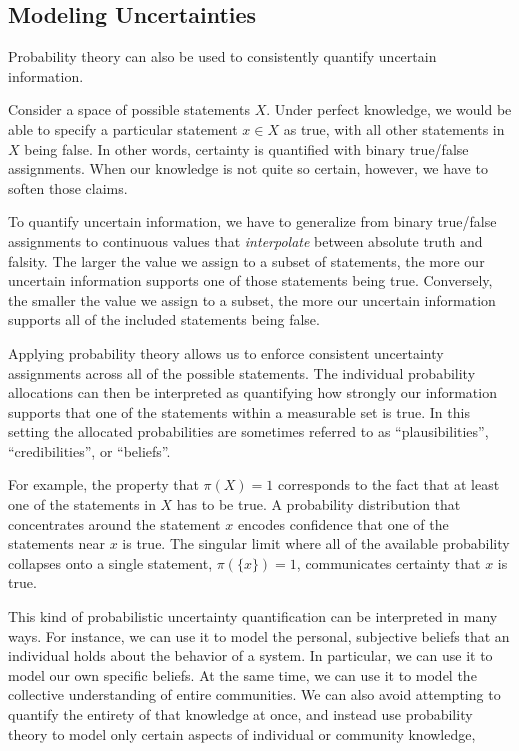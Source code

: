 \documentclass[
  letterpaper,
  DIV=11,
  numbers=noendperiod]{scrartcl}
\begin{document}
\subsection{Modeling Uncertainties}\label{modeling-uncertainties}

Probability theory can also be used to consistently quantify uncertain
information.

Consider a space of possible statements \(X\). Under perfect knowledge,
we would be able to specify a particular statement \(x \in X\) as true,
with all other statements in \(X\) being false. In other words,
certainty is quantified with binary true/false assignments. When our
knowledge is not quite so certain, however, we have to soften those
claims.

To quantify uncertain information, we have to generalize from binary
true/false assignments to continuous values that \emph{interpolate}
between absolute truth and falsity. The larger the value we assign to a
subset of statements, the more our uncertain information supports one of
those statements being true. Conversely, the smaller the value we assign
to a subset, the more our uncertain information supports all of the
included statements being false.

Applying probability theory allows us to enforce consistent uncertainty
assignments across all of the possible statements. The individual
probability allocations can then be interpreted as quantifying how
strongly our information supports that one of the statements within a
measurable set is true. In this setting the allocated probabilities are
sometimes referred to as ``plausibilities'', ``credibilities'', or
``beliefs''.

For example, the property that \(\pi(X) = 1\) corresponds to the fact
that at least one of the statements in \(X\) has to be true. A
probability distribution that concentrates around the statement \(x\)
encodes confidence that one of the statements near \(x\) is true. The
singular limit where all of the available probability collapses onto a
single statement, \(\pi( \{ x \} ) = 1\), communicates certainty that
\(x\) is true.

This kind of probabilistic uncertainty quantification can be interpreted
in many ways. For instance, we can use it to model the personal,
subjective beliefs that an individual holds about the behavior of a
system. In particular, we can use it to model our own specific beliefs.
At the same time, we can use it to model the collective understanding of
entire communities. We can also avoid attempting to quantify the
entirety of that knowledge at once, and instead use probability theory
to model only certain aspects of individual or community knowledge,
\end{document}
